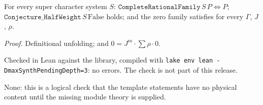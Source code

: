 \begin{proposition}\label{l14:prop:certtheta}
For every super character system $S$: $\mathtt{CompleteRationalFamily}\,S\,P\iff P$; $\mathtt{Conjecture\_HalfWeight}\,S\,
\mathrm{False}$ holds; and the zero family satisfies  for every $\Gamma$, $J$, $\rho$.
\end{proposition}
\noindent\emph{Proof.} Definitional unfolding; and $0 = J^m\cdot\sum\rho\cdot0$.
\begin{status}
Checked in Lean against the library, compiled with \texttt{lake env lean -DmaxSynthPendingDepth=3}: no errors. The check is not
part of this release.
\end{status}
\begin{physics}
None: this is a logical check that the template statements have no physical content until the missing module theory is supplied.
\end{physics}


